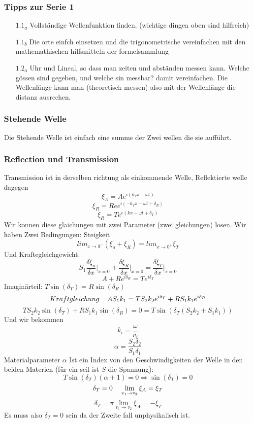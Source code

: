 \documentclass{article}
\newcommand{\mspc}{\hspace{0.4cm}}
\begin{document}
\subsubsection{Tipps zur Serie 1}
\begin{itemize}
  \item[$1.1_a$]{Vollständige Wellenfunktion finden, (wichtige dingen oben sind hilfreich)}
\item[$1.1_b$]{Die orte einfch einsetzen und die trigonometrische vereinfachen mit den mathemathischen hilfsmitteln der formelsammlung}
\item[$1.2_a$]{Uhr und Lineal, so dass man zeiten und abständen messen kann. Welche gössen sind gegeben, und welche sin messbar? damit vereinfachen. Die Wellenlänge kann man (theoretisch messen) also mit der Wellenlänge die distanz ausrechen.}
\end{itemize}
\subsubsection{Stehende Welle} Die Stehende Welle ist einfach eine summe der Zwei wellen die sie aufführt.
\subsubsection{Reflection und Transmission} Transmission ist in derselben richtung als einkommende Welle, Reflektierte welle dagegen
\[\xi_A=Ae^{i(k_1x-\omega t)}\]
\[\xi_R=Ree^{i(-k_1x-\omega t +\delta_R)}\]
\[\xi_R=Te^{e(kx-\omega t +\delta_T)}\]
Wir konnen diese glaichungen mit zwei Parameter (zwei gleichungen) losen.
\newline Wir haben Zwei Bedingungen:
\newline Steigkeit\[lim_{x\rightarrow 0^-}(\xi_a+\xi_R)=lim_{x\rightarrow0^+}\xi_T\]
Und Kraftegleichgewicht:\[S_1\frac{\delta\xi_a}{\delta x}\left.\right|_{x=0}+\frac{\delta\xi_R}{\delta x}\left.\right|_{x=0}=\frac{\delta\xi_T}{\delta x}\left.\right|_{x=0}\]
\[A+Re^{i\delta_R}=Te^{i\delta_T}\]
Imaginärteil: $T\sin(\delta_T)=R\sin(\delta_R)$
\[Kraftgleichung\mspc AS_1k_1=TS_2k_2e^{i\delta_T}+RS_1k_1e^{i\delta_R}\]
\[TS_2k_2\sin(\delta_T)+RS_1k_1\sin(\delta_R)=0=T\sin(\delta_T(S_2k_2+S_1k_1))\]
Und wir bekommen
\[k_i=\frac{\omega}{v_i}\]
\[\alpha=\frac{S_2\delta_2}{S_1\delta_1}\]
Materialparameter $\alpha$ Ist ein Index von den Geschwindigkeiten der Welle in den beiden Materien (für ein seil ist $S$ die Spannung):\[T\sin(\delta_T)(\alpha+1)=0\Rightarrow\sin(\delta_T)=0\]
  \[\delta_T=0\mspc\lim_{v_1\rightarrow v_2}\xi_A=\xi_T\]
  \[\delta_T=\pi\lim_{v_1\rightarrow v_2}\xi_A=-\xi_T\]
Es muss also $\delta_T=0$ sein da der Zweite fall unphysikalisch ist.
\end{document}
